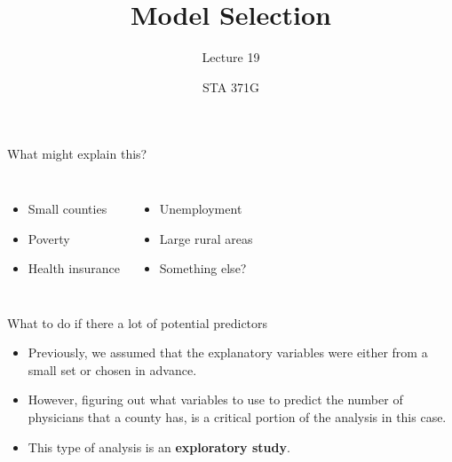 \documentclass{beamer}\usepackage[]{graphicx}\usepackage[]{color}
\title{Model Selection}
\subtitle{Lecture 19}
\author{STA 371G}
\begin{document}
  
  

  \frame{\maketitle}



  \begin{darkframes}
    \begin{frame}
    \end{frame}

    \begin{frame}{What might explain this?}
      \begin{columns}[onlytextwidth]
          \begin{itemize}
            \item Small counties
            \item Poverty
            \item Health insurance
          \end{itemize}
          \begin{itemize}
            \item Unemployment
            \item Large rural areas
            \item Something else?
          \end{itemize}
      \end{columns}

      \lc %
    \end{frame}

    \begin{frame}[fragile]{What to do if there a lot of potential predictors}
      \begin{itemize}[<+->]
        \item Previously, we assumed that the explanatory variables were either from a small set or chosen in advance.
        \item However, figuring out what variables to use to predict the number of physicians that a county has, is a critical portion of the analysis in this case.
        \item This type of analysis is an \textbf{exploratory study}.
      \end{itemize}
    \end{frame}


\end{darkframes}
\end{document}
